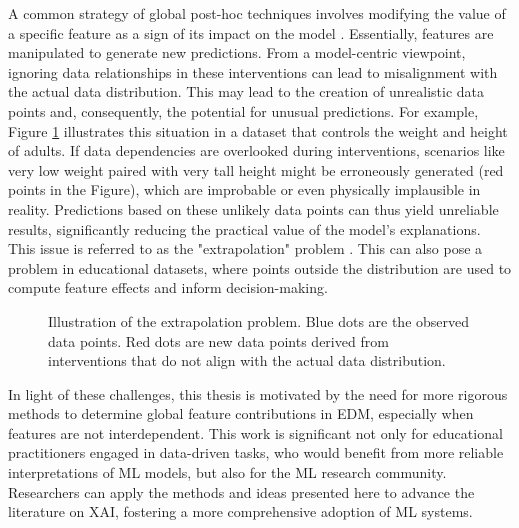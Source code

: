 A common strategy of global post-hoc techniques involves modifying the value of a specific feature as a sign of its impact on the model \cite{Scholbeck2020SamplingInterpretations}. Essentially, features are manipulated to generate new predictions. From a model-centric viewpoint, ignoring data relationships in these interventions can lead to misalignment with the actual data distribution. This may lead to the creation of unrealistic data points and, consequently, the potential for unusual predictions. For example, Figure \ref{fig:extrapolation_introduction} illustrates this situation in a dataset that controls the weight and height of adults.  If data dependencies are overlooked during interventions, scenarios like very low weight paired with very tall height might be erroneously generated (red points in the Figure), which are improbable or even physically implausible in reality. Predictions based on these unlikely data points can thus yield unreliable results, significantly reducing the practical value of the model's explanations. This issue is referred to as the "extrapolation" problem \cite{Molnar2022GeneralModels, Rudin2019StopInstead}. This can also pose a problem in educational datasets, where points outside the distribution are used to compute feature effects and inform decision-making. 

\begin{figure}[ht!]
\centering
  \caption{Illustration of the extrapolation problem. Blue dots are the observed data points. Red dots are new data points derived from interventions that do not align with the actual data distribution.}
    \label{fig:extrapolation_introduction}
\end{figure}

 
In light of these challenges, this thesis is motivated by the need for more rigorous methods to determine global feature contributions in EDM, especially when features are not interdependent. This work is significant not only for educational practitioners engaged in data-driven tasks, who would benefit from more reliable interpretations of ML models, but also for the ML research community. Researchers can apply the methods and ideas presented here to advance the literature on XAI, fostering a more comprehensive adoption of ML systems.
